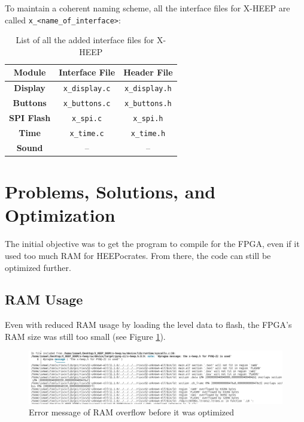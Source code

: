 To maintain a coherent naming scheme, all the interface files for X-HEEP are called \texttt{x\_<name\_of\_interface>}:
\begin{table}[ht]
\centering
\begin{tabular}{|c|c|c|}
\hline
\textbf{Module} & \textbf{Interface File} & \textbf{Header File} \\
\hline
\textbf{Display} & \texttt{x\_display.c} & \texttt{x\_display.h} \\
\hline
\textbf{Buttons} & \texttt{x\_buttons.c} & \texttt{x\_buttons.h} \\
\hline
\textbf{SPI Flash} & \texttt{x\_spi.c} & \texttt{x\_spi.h} \\
\hline
\textbf{Time} & \texttt{x\_time.c} & \texttt{x\_time.h} \\
\hline
\textbf{Sound} & -- & -- \\
\hline
\end{tabular}
\caption{List of all the added interface files for X-HEEP}
\label{table:interfaceFiles}
\end{table}


\section{Problems, Solutions, and Optimization}

The initial objective was to get the program to compile for the FPGA, even if it used too much RAM for HEEPocrates. From there, the code can still be optimized further.

\subsection{RAM Usage}

Even with reduced RAM usage by loading the level data to flash, the FPGA's RAM size was still too small (see Figure \ref{fig:ramOverflowError}).


\begin{figure}[ht]
    \centering
    \includegraphics[width=\textwidth]{images/ramOverflowError.png}
    \caption{Error message of RAM overflow before it was optimized}
    \label{fig:ramOverflowError}
\end{figure}


